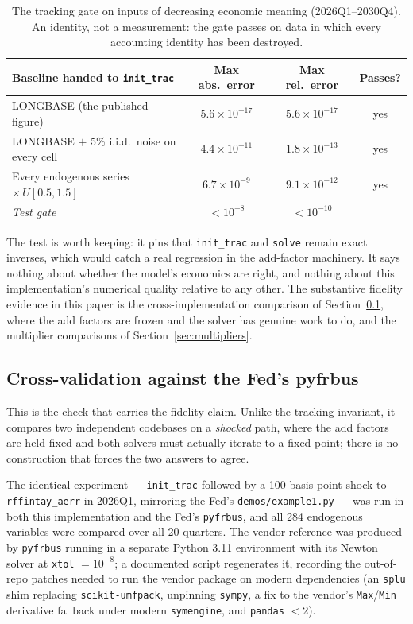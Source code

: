 \begin{table}[htbp]
\centering
\caption{The tracking gate on inputs of decreasing economic meaning (2026Q1--2030Q4). An identity, not a measurement: the gate passes on data in which every accounting identity has been destroyed.}
\label{tab:tracking}
\small
\begin{tabular}{lccc}
\toprule
Baseline handed to \texttt{init\_trac} & Max abs.\ error & Max rel.\ error & Passes? \\
\midrule
LONGBASE (the published figure) & $5.6\times10^{-17}$ & $5.6\times10^{-17}$ & yes \\
LONGBASE $+$ 5\% i.i.d.\ noise on every cell & $4.4\times10^{-11}$ & $1.8\times10^{-13}$ & yes \\
Every endogenous series $\times\,U[0.5,1.5]$ & $6.7\times10^{-9}$ & $9.1\times10^{-12}$ & yes \\
\midrule
\emph{Test gate} & $<10^{-8}$ & $<10^{-10}$ & \\
\bottomrule
\end{tabular}

\medskip
\parbox{0.95\textwidth}{\footnotesize The test is worth keeping: it pins that \texttt{init\_trac} and \texttt{solve} remain exact inverses, which would catch a real regression in the add-factor machinery. It says nothing about whether the model's economics are right, and nothing about this implementation's numerical quality relative to any other. The substantive fidelity evidence in this paper is the cross-implementation comparison of Section~\ref{subsec:crossval}, where the add factors are frozen and the solver has genuine work to do, and the multiplier comparisons of Section~\ref{sec:multipliers}.}
\end{table}

\subsection{Cross-validation against the Fed's pyfrbus}
\label{subsec:crossval}

This is the check that carries the fidelity claim. Unlike the tracking invariant, it compares two independent codebases on a \emph{shocked} path, where the add factors are held fixed and both solvers must actually iterate to a fixed point; there is no construction that forces the two answers to agree.

The identical experiment --- \texttt{init\_trac} followed by a 100-basis-point shock to \texttt{rffintay\_aerr} in 2026Q1, mirroring the Fed's \texttt{demos/example1.py} --- was run in both this implementation and the Fed's \texttt{pyfrbus}, and all 284 endogenous variables were compared over all 20 quarters. The vendor reference was produced by \texttt{pyfrbus} running in a separate Python 3.11 environment with its Newton solver at \texttt{xtol} $=10^{-8}$; a documented script regenerates it, recording the out-of-repo patches needed to run the vendor package on modern dependencies (an \texttt{splu} shim replacing \texttt{scikit-umfpack}, unpinning \texttt{sympy}, a fix to the vendor's \texttt{Max}/\texttt{Min} derivative fallback under modern \texttt{symengine}, and \texttt{pandas} $<2$).

